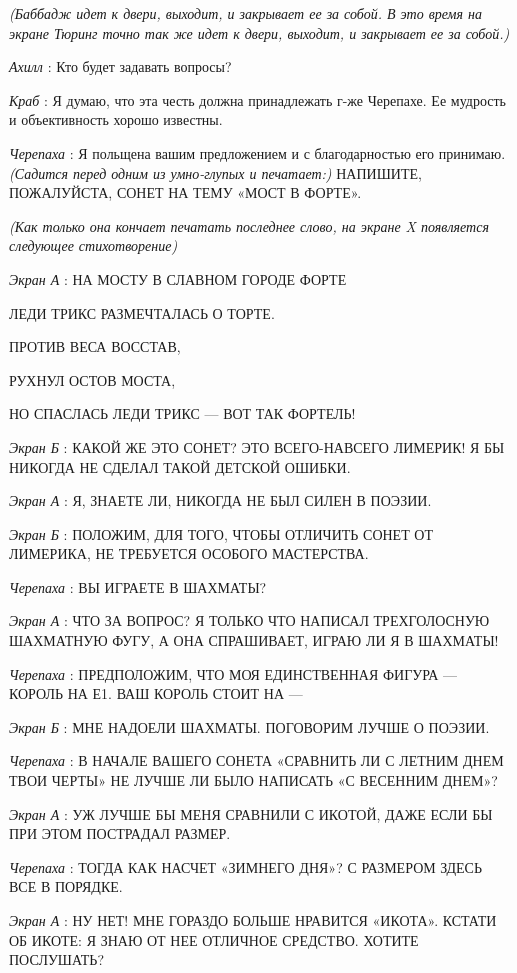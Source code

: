 \documentclass[../main.tex]{subfiles}
\begin{document}
\begin{dialogue}
\emph{(Баббадж идет к двери, выходит, и закрывает ее за собой. В это время на экране Тюринг точно так же идет к двери, выходит, и закрывает ее за собой.)}

\emph{Ахилл} : Кто будет задавать вопросы?

\emph{Краб} : Я думаю, что эта честь должна принадлежать г-же Черепахе. Ее мудрость и объективность хорошо известны.

\emph{Черепаха} : Я польщена вашим предложением и с благодарностью его принимаю. \emph{(Садится перед одним из умно-глупых и печатает:)} НАПИШИТЕ, ПОЖАЛУЙСТА, СОНЕТ НА ТЕМУ «МОСТ В ФОРТЕ».

\emph{(Как только она кончает печатать последнее слово, на экране X появляется следующее стихотворение)}

\emph{Экран А} : НА МОСТУ В СЛАВНОМ ГОРОДЕ ФОРТЕ

ЛЕДИ ТРИКС РАЗМЕЧТАЛАСЬ О ТОРТЕ.

ПРОТИВ ВЕСА ВОССТАВ,

РУХНУЛ ОСТОВ МОСТА,

НО СПАСЛАСЬ ЛЕДИ ТРИКС --- ВОТ ТАК ФОРТЕЛЬ!

\emph{Экран Б} : КАКОЙ ЖЕ ЭТО СОНЕТ? ЭТО ВСЕГО-НАВСЕГО ЛИМЕРИК! Я БЫ НИКОГДА НЕ СДЕЛАЛ ТАКОЙ ДЕТСКОЙ ОШИБКИ.

\emph{Экран А} : Я, ЗНАЕТЕ ЛИ, НИКОГДА НЕ БЫЛ СИЛЕН В ПОЭЗИИ.

\emph{Экран Б} : ПОЛОЖИМ, ДЛЯ ТОГО, ЧТОБЫ ОТЛИЧИТЬ СОНЕТ ОТ ЛИМЕРИКА, НЕ ТРЕБУЕТСЯ ОСОБОГО МАСТЕРСТВА.

\emph{Черепаха} : ВЫ ИГРАЕТЕ В ШАХМАТЫ?

\emph{Экран А} : ЧТО ЗА ВОПРОС? Я ТОЛЬКО ЧТО НАПИСАЛ ТРЕХГОЛОСНУЮ ШАХМАТНУЮ ФУГУ, А ОНА СПРАШИВАЕТ, ИГРАЮ ЛИ Я В ШАХМАТЫ!

\emph{Черепаха} : ПРЕДПОЛОЖИМ, ЧТО МОЯ ЕДИНСТВЕННАЯ ФИГУРА --- КОРОЛЬ НА Е1. ВАШ КОРОЛЬ СТОИТ НА ---

\emph{Экран Б} : МНЕ НАДОЕЛИ ШАХМАТЫ. ПОГОВОРИМ ЛУЧШЕ О ПОЭЗИИ.

\emph{Черепаха} : В НАЧАЛЕ ВАШЕГО СОНЕТА «СРАВНИТЬ ЛИ С ЛЕТНИМ ДНЕМ ТВОИ ЧЕРТЫ» НЕ ЛУЧШЕ ЛИ БЫЛО НАПИСАТЬ «С ВЕСЕННИМ ДНЕМ»?

\emph{Экран А} : УЖ ЛУЧШЕ БЫ МЕНЯ СРАВНИЛИ С ИКОТОЙ, ДАЖЕ ЕСЛИ БЫ ПРИ ЭТОМ ПОСТРАДАЛ РАЗМЕР.

\emph{Черепаха} : ТОГДА КАК НАСЧЕТ «ЗИМНЕГО ДНЯ»? С РАЗМЕРОМ ЗДЕСЬ ВСЕ В ПОРЯДКЕ.

\emph{Экран А} : НУ НЕТ! МНЕ ГОРАЗДО БОЛЬШЕ НРАВИТСЯ «ИКОТА». КСТАТИ ОБ ИКОТЕ: Я ЗНАЮ ОТ НЕЕ ОТЛИЧНОЕ СРЕДСТВО. ХОТИТЕ ПОСЛУШАТЬ?


\end{dialogue}
\end{document}
